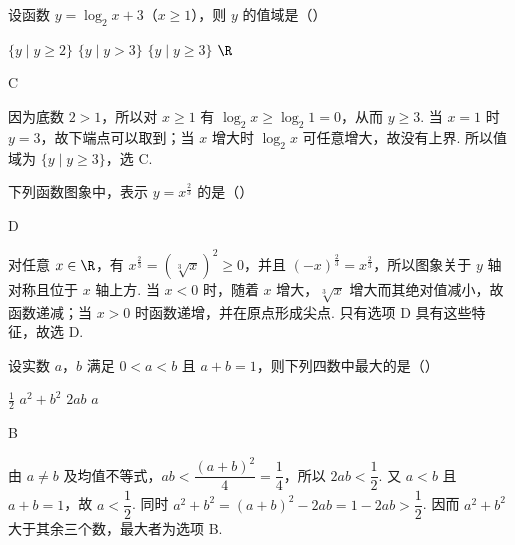 \documentclass[UTF8,a4paper,oneside,11pt]{ctexbook}
\begin{document}
\begin{problem}
设函数 \(y=\log_2 x+3\)（\(x\geqslant 1\)），则 \(y\) 的值域是（\quad）

\choices
    {\(\{y\mid y\geqslant 2\}\)}
    {\(\{y\mid y>3\}\)}
    {\(\{y\mid y\geqslant 3\}\)}
    {\(\R\)}
\end{problem}

\begin{answer}
C
\end{answer}

\begin{solution}
因为底数 \(2>1\)，所以对 \(x\geqslant1\) 有 \(\log_2x\geqslant\log_2 1=0\)，从而 \(y\geqslant3\). 当 \(x=1\) 时 \(y=3\)，故下端点可以取到；当 \(x\) 增大时 \(\log_2x\) 可任意增大，故没有上界. 所以值域为 \(\{y\mid y\geqslant3\}\)，选 C.
\end{solution}

\begin{problem}
下列函数图象中，表示 \(y=x^{\frac{2}{3}}\) 的是（\quad）

\choices
    {}
    {}
    {}
    {}
\end{problem}

\begin{answer}
D
\end{answer}

\begin{solution}
对任意 \(x\in\R\)，有 \(x^{\frac{2}{3}}=\left(\sqrt[3]{x}\right)^2\geqslant0\)，并且 \((-x)^{\frac{2}{3}}=x^{\frac{2}{3}}\)，所以图象关于 \(y\) 轴对称且位于 \(x\) 轴上方. 当 \(x<0\) 时，随着 \(x\) 增大，\(\sqrt[3]{x}\) 增大而其绝对值减小，故函数递减；当 \(x>0\) 时函数递增，并在原点形成尖点. 只有选项 D 具有这些特征，故选 D.
\end{solution}

\begin{problem}
设实数 \(a\)，\(b\) 满足 \(0<a<b\) 且 \(a+b=1\)，则下列四数中最大的是（\quad）

\choices
    {\(\frac{1}{2}\)}
    {\(a^2+b^2\)}
    {\(2ab\)}
    {\(a\)}
\end{problem}

\begin{answer}
B
\end{answer}

\begin{solution}
由 \(a\ne b\) 及均值不等式，\(ab<\dfrac{(a+b)^2}{4}=\dfrac14\)，所以 \(2ab<\dfrac12\). 又 \(a<b\) 且 \(a+b=1\)，故 \(a<\dfrac12\). 同时
\(a^2+b^2=(a+b)^2-2ab=1-2ab>\dfrac12\). 因而 \(a^2+b^2\) 大于其余三个数，最大者为选项 B.
\end{solution}
\end{document}
